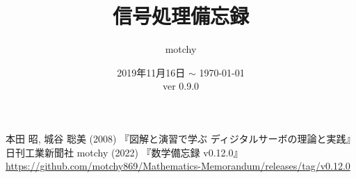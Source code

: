 \documentclass[dvipdfmx,uplatex,report]{jsbook} %
\theoremstyle{definition} %
\def\docVerMajor{0}
\def\docVerMinor{9}
\def\docVerPatch{0}
\def\docVerWip{} %
\def\docVer{\docVerMajor.\docVerMinor.\docVerPatch\docVerWip}
\begin{document}
	\title{信号処理備忘録}
	\author{motchy}
	\date{ 2019年11月16日 $\sim$ \today \\ver \docVer}
	\maketitle
	{\scriptsize \tableofcontents}

	
	
	
	
	
	
	
	
	
	
	
	
	
	
	

	\begin{thebibliography}{9}
		本田 昭, 城谷 聡美 (2008) 『図解と演習で学ぶ ディジタルサーボの理論と実践』日刊工業新聞社
		motchy (2022) 『数学備忘録 v0.12.0』\url{https://github.com/motchy869/Mathematics-Memorandum/releases/tag/v0.12.0}
	\end{thebibliography}
\end{document}
